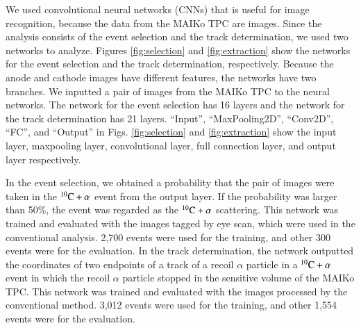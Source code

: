 \documentclass{jps-cp}
\begin{document}
We used convolutional neural networks (CNNs) that is useful for image recognition,
because the data from the MAIKo TPC are images.
Since the analysis consists of the event selection and the track determination,
we used two networks to analyze.
Figures \ref{fig:selection} and \ref{fig:extraction} show
the networks for the event selection and the track determination, respectively.
Because the anode and cathode images have different features,
the networks have two branches.
We inputted a pair of images from the MAIKo TPC to the neural networks.
The network for the event selection has 16 layers and the network for the track determination has 21 layers.
``Input'', ``MaxPooling2D'', ``Conv2D'', ``FC'', and ``Output'' in Figs. \ref{fig:selection} and \ref{fig:extraction} show
the input layer, maxpooling layer, convolutional layer, full connection layer, and output layer respectively.

In the event selection, we obtained a probability that the pair of images were taken
in the ${}^{10}\rm{C}+\alpha$ event from the output layer.
If the probability was larger than 50\%, the event was regarded as the ${}^{10}\rm{C}+\alpha$ scattering.
This network was trained and evaluated with the images tagged by eye scan,
which were used in the conventional analysis.
2,700 events were used for the training, and other 300 events were for the evaluation.
In the track determination, the network outputted the coordinates of two endpoints of
a track of a recoil $\alpha$ particle in a ${}^{10}\rm{C}+\alpha$ event in which the recoil $\alpha$ particle stopped
in the sensitive volume of the MAIKo TPC.
This network was trained and evaluated with the images processed by the conventional method.
3,012 events were used for the training, and other 1,554 events were for the evaluation.
\end{document}
